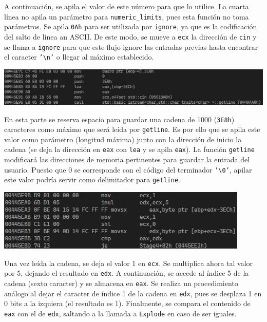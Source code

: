 \documentclass[11pt,a4paper]{article}
\begin{document}
A continuación, se apila el valor de este número para que lo utilice. La cuarta línea no apila un parámetro para \texttt{numeric\_limits},
pues esta función no toma parámetros. Se apila \texttt{0Ah} para ser utilizada por \texttt{ignore}, ya que es la codificación del salto de
línea an ASCII. De este modo, se mueve a \texttt{ecx} la dirección de \texttt{cin} y se llama a \texttt{ignore} para que este flujo ignore
las entradas previas hasta encontrar el caracter \texttt{'\textbackslash n'} o llegar al máximo establecido.

\begin{center}
  \includegraphics[width=\textwidth]{Stage4/img3.png}
\end{center}

En esta parte se reserva espacio para guardar una cadena de 1000 (\texttt{3E8h}) caracteres como máximo
que será leída por \texttt{getline}. Es por ello que se apila este valor como parámetro (longitud máxima)
junto con la dirección de inicio la cadena (se deja la dirección en \texttt{eax} con \texttt{lea} y se apila
\texttt{eax}). La función \texttt{getline} modificará las direcciones de memoria pertinentes para guardar la
entrada del usuario. Puesto que 0 se corresponde con el código del terminador \texttt{'\textbackslash 0'},
apilar este valor podría servir como delimitador para \texttt{getline}.
\\
\begin{center}
  \includegraphics[width=\textwidth]{Stage4/img4.png}
\end{center}

\vspace{2mm}
Una vez leída la cadena, se deja el valor 1 en \texttt{ecx}. Se multiplica
ahora tal valor por 5, dejando el resultado en \texttt{edx}. A continuación,
se accede al índice 5 de la cadena (sexto caracter) y se almacena en \texttt{eax}.
Se realiza un procedimiento análogo al dejar el caracter de índice 1 de la cadena
en \texttt{edx}, pues se desplaza 1 en 0 bits a la izquiera (el resultado es 1).
Finalmente, se compara el contenido de \texttt{eax} con el de \texttt{edx}, saltando
a la llamada a \texttt{Explode} en caso de ser iguales.
\\
\end{document}
